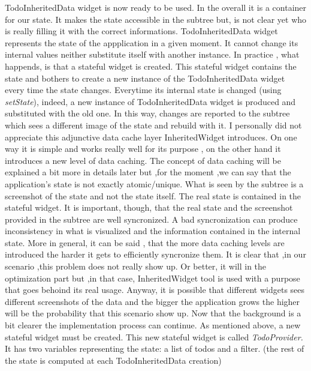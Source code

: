 TodoInheritedData widget is now ready to be used. In the overall it is a container for our state. It makes the state accessible in the subtree but, is not clear yet who is really filling it with the correct informations. TodoInheritedData widget represents the state of the appplication in a given moment. It cannot change its internal values neither substitute itself with another instance. In practice , what happends, is that a stateful widget is created. This stateful widget contains the state and bothers to create a new instance of the TodoInheritedData widget every time the state changes. Everytime its internal state is changed (using \textit{setState}), indeed, a new instance of TodoInheritedData widget is produced and substituted with the old one. In this way, changes are reported to the subtree which sees a different image of the state and rebuild with it. I personally did not appreciate this adjunctive data cache layer InheritedWidget introduces. On one way it is simple and works really well for its purpose , on the other hand it introduces a new level of data caching. The concept of data caching will be explained a bit more in details later but ,for the moment ,we can say that the application's state is not exactly atomic/unique. What is seen by the subtree is a screenshot of the state and not the state itself. The real state is contained in the stateful widget. It is important, though, that the real state and the screenshot provided in the subtree are well syncronized. A bad syncronization can produce inconsistency in what is visualized and the information contained in the internal state. More in general, it can be said , that the more data caching levels are introduced the harder it gets to efficiently syncronize them. It is clear that ,in our scenario ,this problem does not really show up. Or better, it will in the optimization part but ,in that case, InheritedWidget tool is used with a purpose that goes behoind its real usage. Anyway, it is possible that different widgets sees different screenshots of the data and the bigger the application grows the higher will be the probability that this scenario show up. Now that the background is a bit clearer the implementation process can continue. As mentioned above, a new stateful widget must be created. This new stateful widget is called \textit{TodoProvider.} It has two variables representing the state: a list of todos and a filter. (the rest of the state is computed at each TodoInheritedData creation)
\mbox{}\\
